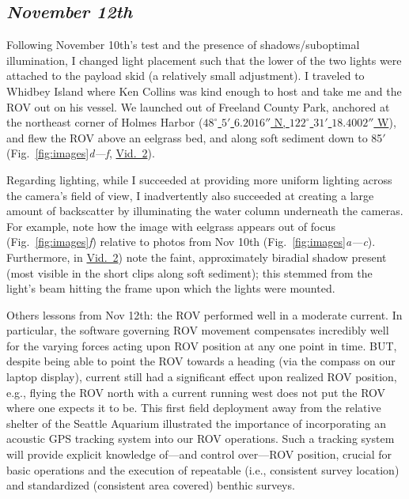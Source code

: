 \documentclass[11pt]{article}
\begin{document}
\subsection{\textit{November 12th}}
Following November 10th's test and the presence of shadows/suboptimal 
illumination, I changed light placement such that the lower of the two 
lights were attached to the payload skid (a relatively small 
adjustment). 
I traveled to Whidbey Island where Ken Collins was kind enough to host 
and take me and the ROV out on his vessel. 
We launched out of Freeland County Park, anchored at the northeast 
corner of Holmes Harbor 
(\href{https://www.whatsmygps.com/?lat=48.085055555555556\&lng=-122.52177777777777}
{$48^\circ$ $5'$ $6.2016''$ N, $122^\circ$ $31'$ $18.4002''$ W}),
 and flew the ROV above an eelgrass bed, and along soft sediment down 
 to 85$'$ (Fig.~\ref{fig:images}\textit{d---f}, 
\href{https://drive.google.com/file/d/1Ure4E4GWHOEm1omK0y09ecN_KXguUfjQ/view?usp=sharing}{Vid.~2}).

Regarding lighting, while I succeeded at providing more uniform 
lighting across the camera's field of view, I inadvertently also 
succeeded at creating a large amount of backscatter by illuminating the 
water column underneath the cameras. 
For example, note how the image with eelgrass appears out of focus 
(Fig.~\ref{fig:images}\textit{f}) relative to photos from Nov 10th 
(Fig.~\ref{fig:images}\textit{a---c}).
Furthermore, in 
\href{https://drive.google.com/file/d/1Ure4E4GWHOEm1omK0y09ecN_KXguUfjQ/view?usp=sharing}{Vid.~2})
note the faint, approximately biradial shadow present  
(most visible in the short clips along soft sediment); 
this stemmed from the light's beam hitting the frame upon which the 
lights were mounted.

Others lessons from Nov 12th: the ROV performed well in a moderate 
current. 
In particular, the software governing ROV movement compensates 
incredibly well for the varying forces acting upon ROV position at any 
one point in time. 
BUT, despite being able to point the ROV towards a heading 
(via the compass on our laptop display), current still had a 
significant effect upon realized ROV position, e.g., flying the ROV 
north with a current running west does not put the ROV where one 
expects it to be.
This first field deployment away from the relative shelter of the 
Seattle Aquarium illustrated the importance of incorporating an 
acoustic GPS 
tracking system into our ROV operations. 
Such a tracking system will provide explicit knowledge of---and control 
over---ROV position, crucial for basic operations and the execution of 
repeatable (i.e., consistent survey location) and standardized 
(consistent area covered) benthic surveys. 
\end{document}
